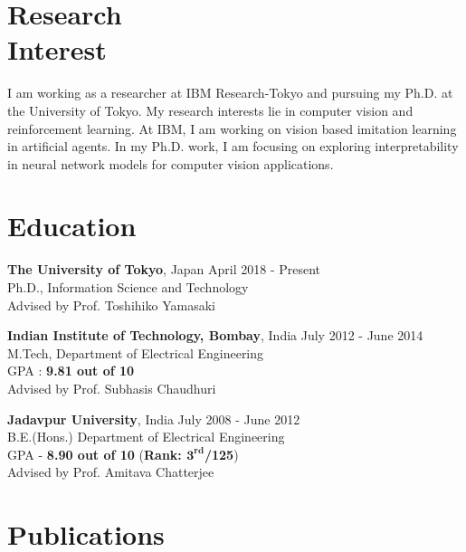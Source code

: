 \documentclass[margin,line]{res}
\begin{document}
\begin{resume}
\section{\sc Research\\Interest}
I am working as a researcher at IBM Research-Tokyo and pursuing my Ph.D. at the University of Tokyo. My research interests lie in computer vision and reinforcement learning. At IBM, I am working on vision based imitation learning in artificial agents. In my Ph.D. work, I am focusing on exploring interpretability in neural network models for computer vision applications.

\section{\sc Education}

\textbf{The University of Tokyo}, Japan \hfill April 2018 - Present \\
Ph.D., Information Science and Technology\\
Advised by Prof. Toshihiko Yamasaki

\textbf{Indian Institute of Technology, Bombay}, India \hfill July 2012 - June 2014 \\
M.Tech, Department of Electrical Engineering\\
GPA : \textbf{9.81 out of 10}\\
Advised by Prof. Subhasis Chaudhuri %

\textbf{Jadavpur University}, India \hfill July 2008 - June 2012 \\ 
B.E.(Hons.) Department of Electrical Engineering\\
GPA - \textbf{8.90 out of 10} (\textbf{Rank: $\mathbf{3^{rd}}$/125}) \\
Advised by Prof. Amitava Chatterjee


\section{\sc Publications}



\end{resume}
\end{document}
